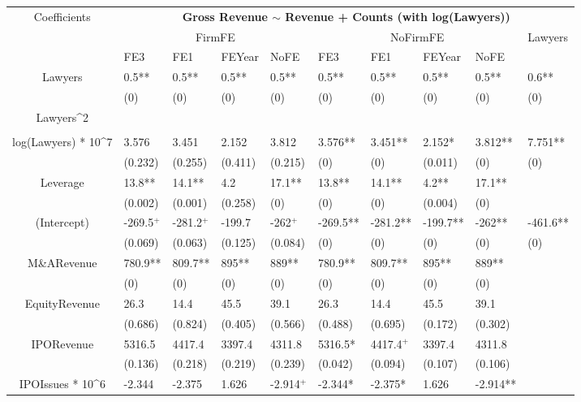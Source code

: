 \documentclass{article}
\begin{document}
\begin{table}[H]
\centering
\begin{tabular}{|clllllllll|}
\hline
\multirow{3}{*}{Coefficients} & \multicolumn{9}{c|}{\textbf{Gross Revenue $\sim$ Revenue + Counts (with log(Lawyers))}} \\
\cline{2-10}
& \multicolumn{4}{c}{FirmFE} & \multicolumn{4}{c}{NoFirmFE} & \multirow{2}{*}{Lawyers} \\
\cline{2-9}
& FE3 & FE1 & FEYear & NoFE & FE3 & FE1 & FEYear & NoFE &  \\
\hline
 
Lawyers & 0.5** & 0.5** & 0.5** & 0.5** & 0.5** & 0.5** & 0.5** & 0.5** & 0.6** \\ 
   & (0) & (0) & (0) & (0) & (0) & (0) & (0) & (0) & (0) \\ 
  Lawyers^2 &  &  &  &  &  &  &  &  &  \\ 
   &  &  &  &  &  &  &  &  &  \\ 
  log(Lawyers) * 10^7 & 3.576 & 3.451 & 2.152 & 3.812 & 3.576** & 3.451** & 2.152* & 3.812** & 7.751** \\ 
   & (0.232) & (0.255) & (0.411) & (0.215) & (0) & (0) & (0.011) & (0) & (0) \\ 
  Leverage & 13.8** & 14.1** & 4.2 & 17.1** & 13.8** & 14.1** & 4.2** & 17.1** &  \\ 
   & (0.002) & (0.001) & (0.258) & (0) & (0) & (0) & (0.004) & (0) &  \\ 
  (Intercept) & -269.5$^{+}$ & -281.2$^{+}$ & -199.7 & -262$^{+}$ & -269.5** & -281.2** & -199.7** & -262** & -461.6** \\ 
   & (0.069) & (0.063) & (0.125) & (0.084) & (0) & (0) & (0) & (0) & (0) \\ 
  M\&ARevenue & 780.9** & 809.7** & 895** & 889** & 780.9** & 809.7** & 895** & 889** &  \\ 
   & (0) & (0) & (0) & (0) & (0) & (0) & (0) & (0) &  \\ 
  EquityRevenue & 26.3 & 14.4 & 45.5 & 39.1 & 26.3 & 14.4 & 45.5 & 39.1 &  \\ 
   & (0.686) & (0.824) & (0.405) & (0.566) & (0.488) & (0.695) & (0.172) & (0.302) &  \\ 
  IPORevenue & 5316.5 & 4417.4 & 3397.4 & 4311.8 & 5316.5* & 4417.4$^{+}$ & 3397.4 & 4311.8 &  \\ 
   & (0.136) & (0.218) & (0.219) & (0.239) & (0.042) & (0.094) & (0.107) & (0.106) &  \\ 
  IPOIssues * 10^6 & -2.344 & -2.375 & 1.626 & -2.914$^{+}$ & -2.344* & -2.375* & 1.626 & -2.914** &  \\ 

\end{tabular}
\end{table}
\end{document}
